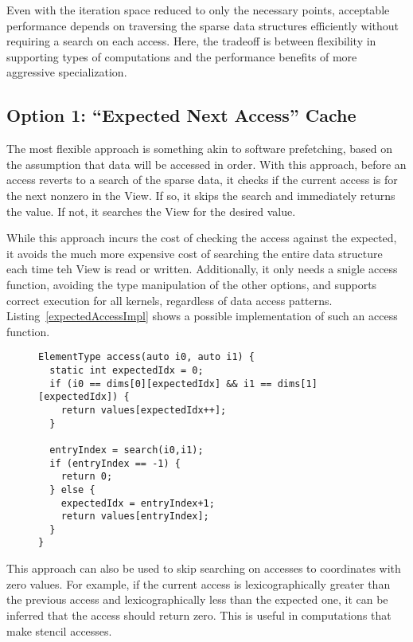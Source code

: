 Even with the iteration space reduced to only the necessary points, acceptable performance depends on traversing the sparse data structures efficiently without requiring a search on each access.
Here, the tradeoff is between flexibility in supporting types of computations and the performance benefits of more aggressive specialization.

\subsection{Option 1: ``Expected Next Access'' Cache}

The most flexible approach is something akin to software prefetching, based on the assumption that data will be accessed in order. 
With this approach, before an access reverts to a search of the sparse data, it checks if the current access is for the next nonzero in the View.
If so, it skips the search and immediately returns the value.
If not, it searches the View for the desired value.

While this approach incurs the cost of checking the access against the expected, it avoids the much more expensive cost of searching the entire data structure each time teh View is read or written.
Additionally, it only needs a snigle access function, avoiding the type manipulation of the other options, and supports correct execution for all kernels, regardless of data access patterns.
Listing~\ref{expectedAccessImpl} shows a possible implementation of such an access function.
\begin{figure}
\begin{lstlisting}[caption={Possible implementation fo the Expected Next Access approach to efficient data traversal.},label=expectedAccessImpl]
ElementType access(auto i0, auto i1) {
  static int expectedIdx = 0;
  if (i0 == dims[0][expectedIdx] && i1 == dims[1][expectedIdx]) {
    return values[expectedIdx++];
  }
  
  entryIndex = search(i0,i1);
  if (entryIndex == -1) {
    return 0;
  } else {
    expectedIdx = entryIndex+1;
    return values[entryIndex];
  }
}
\end{lstlisting}
\end{figure}

This approach can also be used to skip searching on accesses to coordinates with zero values.
For example, if the current access is lexicographically greater than the previous access and lexicographically less than the expected one, it can be inferred that the access should return zero. This is useful in computations that make stencil accesses.

